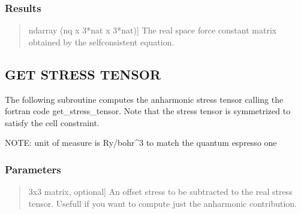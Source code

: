 \documentclass[a4paper,11pt,english]{sphinxmanual}
\begin{document}
\begin{fulllineitems}
\begin{fulllineitems}
\begin{quote}
\begin{description}
\end{description}
\end{quote}


\subsubsection{Results}
\label{\detokenize{apireference:id13}}\begin{quote}
\begin{description}
\sphinxlineitem{fc}{[}ndarray (nq x 3*nat x 3*nat){]}
\sphinxAtStartPar
The real space force constant matrix obtained by the
self\sphinxhyphen{}consistent equation.

\end{description}
\end{quote}

\end{fulllineitems}


\begin{fulllineitems}
\label{\detokenize{apireference:sscha.Ensemble.Ensemble.get_stress_tensor}}
\pysigstartsignatures
{}
\pysigstopsignatures

\subsection{GET STRESS TENSOR}
\label{\detokenize{apireference:get-stress-tensor}}
\sphinxAtStartPar
The following subroutine computes the anharmonic stress tensor
calling the fortran code get\_stress\_tensor.
Note that the stress tensor is symmetrized to satisfy the cell constraint.

\sphinxAtStartPar
NOTE: unit of measure is Ry/bohr\textasciicircum{}3 to match the quantum espresso one


\subsubsection{Parameters}
\label{\detokenize{apireference:id14}}\begin{quote}
\begin{description}
\sphinxlineitem{offset\_stress}{[}3x3 matrix, optional{]}
\sphinxAtStartPar
An offset stress to be subtracted to the real stress tensor.
Usefull if you want to compute just the anharmonic contribution.


\end{description}
\end{quote}
\end{fulllineitems}
\end{fulllineitems}
\end{document}
